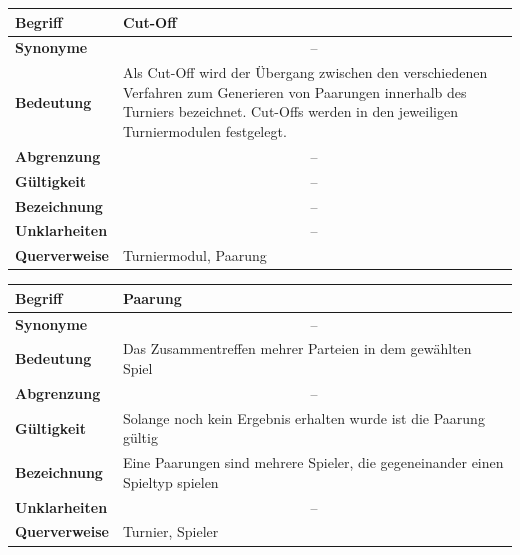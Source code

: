\documentclass[11pt]{article}
\begin{document}
\begin{tabularx}{\textwidth}{| p{} | p{} |}
	\hline
	\textbf{Begriff} & Cut-Off\\
	\hline
	\textbf{Synonyme} & \multicolumn{1}{|c|}{--} \\
	\hline
	\textbf{Bedeutung} & Als Cut-Off wird der Übergang zwischen den verschiedenen Verfahren zum Generieren von Paarungen innerhalb des Turniers bezeichnet. Cut-Offs werden in den jeweiligen Turniermodulen festgelegt.\\
	\hline
	\textbf{Abgrenzung} & \multicolumn{1}{|c|}{--} \\
	\hline
	\textbf{Gültigkeit} & \multicolumn{1}{|c|}{--} \\
	\hline
	\textbf{Bezeichnung} & \multicolumn{1}{|c|}{--} \\
	\hline
	\textbf{Unklarheiten} & \multicolumn{1}{|c|}{--} \\
	\hline
	\textbf{Querverweise} & Turniermodul, Paarung \\
	\hline
\end{tabularx}

\newpage
	
\begin{tabularx}{\textwidth}{| p{} | p{} |}
	\hline
	\textbf{Begriff} & Paarung\\
	\hline
	\textbf{Synonyme} & \multicolumn{1}{|c|}{--} \\
	\hline
	\textbf{Bedeutung} & Das Zusammentreffen mehrer Parteien in dem gewählten Spiel\\
	\hline
	\textbf{Abgrenzung} & \multicolumn{1}{|c|}{--} \\
	\hline
	\textbf{Gültigkeit} & Solange noch kein Ergebnis erhalten wurde ist die Paarung gültig\\
	\hline
	\textbf{Bezeichnung} & Eine Paarungen sind mehrere Spieler, die gegeneinander einen Spieltyp spielen\\
	\hline 
	\textbf{Unklarheiten} & \multicolumn{1}{|c|}{--} \\
	\hline
	\textbf{Querverweise} &  Turnier, Spieler\\
	\hline
\end{tabularx}
\end{document}
